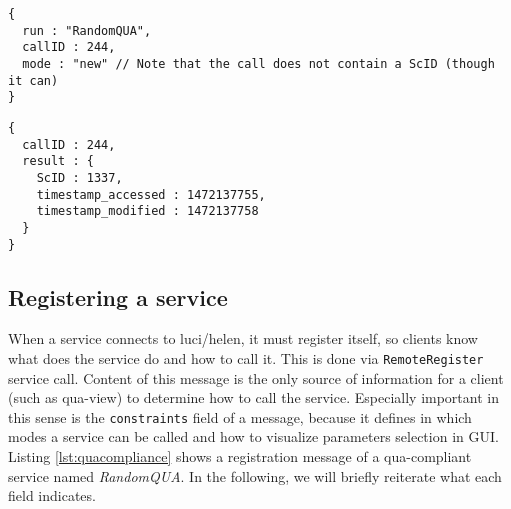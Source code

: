 \begin{lstlisting}[caption={A qua-compliant service run request for mode \texttt{new}}, label={lst:quacompliantinput:new}]
{
  run : "RandomQUA",
  callID : 244,
  mode : "new" // Note that the call does not contain a ScID (though it can)
}
\end{lstlisting}

\begin{lstlisting}[caption={A qua-compliant service output for mode \texttt{new}}, label={lst:quacompliantresult:new}]
{
  callID : 244,
  result : {
    ScID : 1337,
    timestamp_accessed : 1472137755,
    timestamp_modified : 1472137758
  }
}
\end{lstlisting}

\subsection{Registering a service}

When a service connects to luci/helen, it must register itself, so clients know what does the service do and how to call it.
This is done via \texttt{RemoteRegister} service call.
Content of this message is the only source of information for a client (such as qua-view) to determine how to call the service.
Especially important in this sense is the \texttt{constraints} field of a message, because 
it defines in which modes a service can be called and how to visualize parameters selection in GUI.
Listing \ref{lst:quacompliance} shows a registration message of a qua-compliant service named \emph{RandomQUA}. In the following, we will briefly reiterate what each field indicates.

